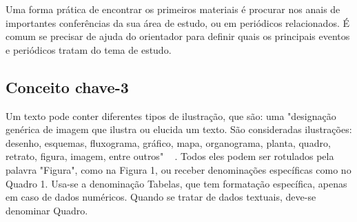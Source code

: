Uma forma prática de encontrar os primeiros materiais é procurar nos anais de importantes conferências da sua área de estudo, ou em periódicos relacionados. É comum se precisar de ajuda do orientador para definir quais os principais eventos e periódicos tratam do tema de estudo.

\subsection{Conceito chave-3}

Um texto pode conter diferentes tipos de ilustração, que são: uma "designação genérica de imagem que ilustra ou elucida um texto. São consideradas ilustrações: desenho, esquemas, fluxograma, gráfico, mapa, organograma, planta, quadro, retrato, figura, imagem, entre outros" ~ \cite{ufc_guia}. Todos eles podem ser rotulados pela palavra "Figura", como na Figura 1, ou receber denominações específicas como no Quadro 1. 
Usa-se a denominação Tabelas, que tem formatação específica, apenas em caso de dados numéricos. Quando se tratar de dados textuais, deve-se denominar Quadro.

\begin{figure}[htbp]
	\centering	
\end{figure}

\begin{table}[h!]
\end{table}


